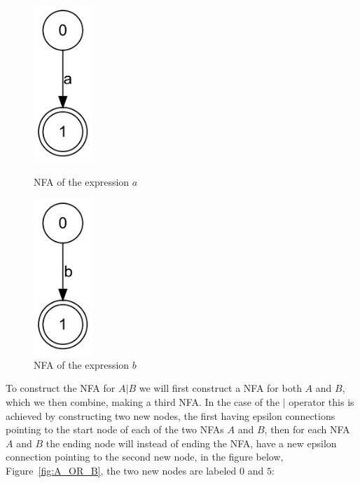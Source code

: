 \begin{figure}[h!]
\begin{minipage}[b]{0.45\linewidth}
  \centering
      \includegraphics[width=0.2\textwidth]{lib/A.png}
  \caption{NFA of the expression $a$}
\label{fig:A}
  \end{minipage}
\begin{minipage}[b]{0.45\linewidth}

  \centering
      \includegraphics[width=0.2\textwidth]{lib/B.png}
  \caption{NFA of the expression $b$}
  \label{fig:B}

    \end{minipage}
\end{figure}

To construct the NFA for $A | B$  we will first construct a NFA for both $A$ and $B$, which we then combine, making a third NFA. In the case of the $|$ operator this is achieved by constructing two new nodes, the first having epsilon connections pointing to the start node of each of the two NFAs $A$ and $B$, then for each NFA $A$ and $B$ the ending node will instead of ending the NFA, have a new epsilon connection pointing to the second new node, in the figure below, Figure~\ref{fig:A_OR_B}, the two new nodes are labeled $0$ and $5$:

